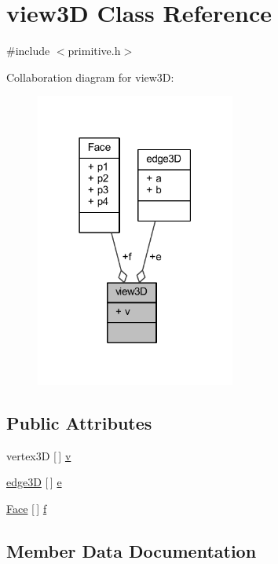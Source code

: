 \hypertarget{classview3_d}{}\section{view3D Class Reference}
\label{classview3_d}


{\ttfamily \#include $<$primitive.\+h$>$}



Collaboration diagram for view3D\+:
\nopagebreak
\begin{figure}[H]
\begin{center}
\leavevmode
\includegraphics[width=186pt]{classview3_d__coll__graph}
\end{center}
\end{figure}
\subsection*{Public Attributes}
\begin{DoxyCompactItemize}
\item 
vertex3D \mbox{[}$\,$\mbox{]} \mbox{\hyperlink{classview3_d_a6a7f3e82c10b2c7476ffd8be0d3ecee2}{v}}
\item 
\mbox{\hyperlink{classedge3_d}{edge3D}} \mbox{[}$\,$\mbox{]} \mbox{\hyperlink{classview3_d_a1aa4051bc2abc3748148b2f1dfd036db}{e}}
\item 
\mbox{\hyperlink{class_face}{Face}} \mbox{[}$\,$\mbox{]} \mbox{\hyperlink{classview3_d_af8d43cfca632dd12bdb5eb8558b8ae62}{f}}
\end{DoxyCompactItemize}


\subsection{Member Data Documentation}
\mbox{\label{classview3_d_a1aa4051bc2abc3748148b2f1dfd036db}} 
